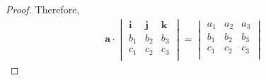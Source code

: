 \documentclass{article}
\begin{document}
\begin{proof}
Therefore,
\begin{align*}
    \mathbf{a} \cdot
    \begin{vmatrix}
      \mathbf{i} & \mathbf{j} & \mathbf{k} \\
      b_1 & b_2 & b_3 \\
      c_1 & c_2 & c_3 \\
    \end{vmatrix}
    =
    \begin{vmatrix}
    a_1 & a_2 & a_3 \\
    b_1 & b_2 & b_3 \\
    c_1 & c_2 & c_3 \\
    \end{vmatrix}
\end{align*}
\end{proof}
%
%
%
%
\end{document}
